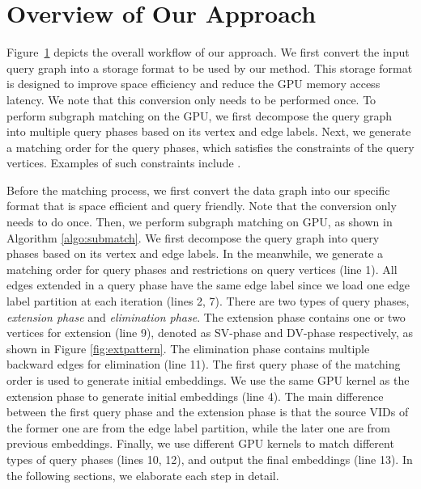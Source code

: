\section{Overview of Our Approach}
Figure~\ref{} depicts the overall workflow of our approach. We first convert the input query graph into a storage format to be used by our
method. This storage format is designed to improve space efficiency and reduce the GPU memory access latency. We note that this conversion
only needs to be performed once. To perform subgraph matching on the GPU, we first decompose the query graph into multiple query phases
based on its vertex and edge labels. Next, we generate a matching order for the query phases, which satisfies the constraints of the query
vertices. Examples of such constraints include .


Before the matching process, we first convert the data graph into our specific format that is space efficient and query friendly. Note that
the conversion only needs to do once. Then, we perform subgraph matching on GPU, as shown in Algorithm \ref{algo:submatch}. We first
decompose the query graph into query phases based on its vertex and edge labels. In the meanwhile, we generate a matching order for query
phases and restrictions on query vertices (line 1). All edges extended in a query phase have the same edge label since we load one edge
label partition at each iteration (lines 2, 7). There are two types of query phases, \emph{extension phase} and \emph{elimination phase}.
The extension phase contains one or two vertices for extension (line 9), denoted as SV-phase and DV-phase respectively, as shown in Figure
\ref{fig:extpattern}. The elimination phase contains multiple backward edges for elimination (line 11). The first query phase of the
matching order is used to generate initial embeddings. We use the same GPU kernel as the extension phase to generate initial embeddings
(line 4). The main difference between the first query phase and the extension phase is that the source VIDs of the former one are from the
edge label partition, while the later one are from previous embeddings. Finally, we use different GPU kernels to match different types of
query phases (lines 10, 12), and output the final embeddings (line 13). In the following sections, we elaborate each step in detail.




